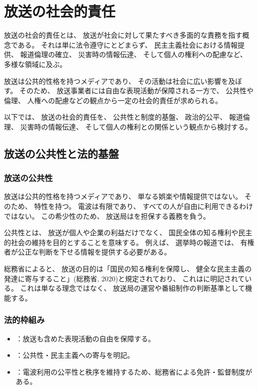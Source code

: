 \chapter{放送の社会的責任}

放送の社会的責任とは、
放送が社会に対して果たすべき多面的な責務を指す概念である。
それは単に法令遵守にとどまらず、
民主主義社会における情報提供、
報道倫理の確立、
災害時の情報伝達、
そして個人の権利への配慮など、
多様な領域に及ぶ。

放送は公共的性格を持つメディアであり、
その活動は社会に広い影響を及ぼす。
そのため、
放送事業者には自由な表現活動が保障される一方で、
公共性や倫理、
人権への配慮などの観点から一定の社会的責任が求められる。

以下では、
放送の社会的責任を、
公共性と制度的基盤、
政治的公平、
報道倫理、
災害時の情報伝達、
そして個人の権利との関係という観点から検討する。

\section{放送の公共性と法的基盤}

\subsection{放送の公共性}

放送は公共的性格を持つメディアであり、
単なる娯楽や情報提供ではない。
そのため、
特性を持つ。
電波は有限であり、
すべての人が自由に利用できるわけではない。
この希少性のため、
放送局はを担保する義務を負う。

公共性とは、
放送が個人や企業の利益だけでなく、
国民全体の知る権利や民主的社会の維持を目的とすることを意味する。
例えば、
選挙時の報道では、
有権者が公正な判断を下せる情報を提供する必要がある。

総務省によると、
放送の目的は「国民の知る権利を保障し、
健全な民主主義の発達に寄与すること」{\small(総務省, 2020)}と規定されており、
これはに明記されている。
これは単なる理念ではなく、
放送局の運営や番組制作の判断基準として機能する。

\subsection{法的枠組み}

\begin{itemize}
  \item {}：放送も含めた表現活動の自由を保障する。
  \item {}：公共性・民主主義への寄与を明記。
  \item {}：電波利用の公平性と秩序を維持するため、総務省による免許・監督制度がある。
\end{itemize}


